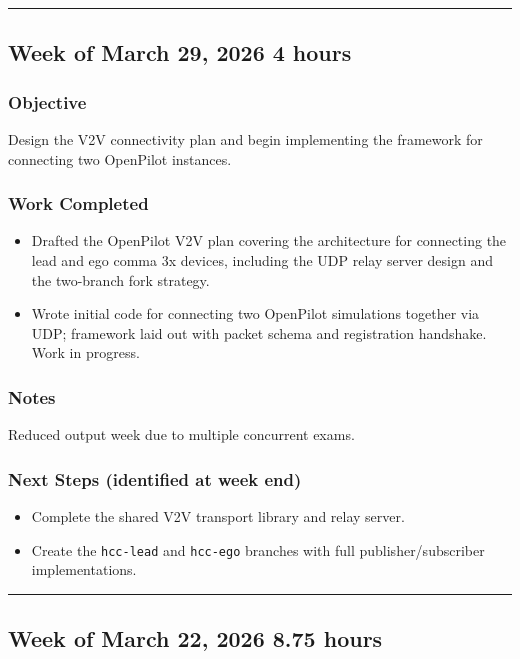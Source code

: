 \documentclass[12pt]{article}
\begin{document}
\hrule\vspace{0.5em}

\subsection{Week of March 29, 2026 \hfill \normalfont\small 4 hours}

\subsubsection{Objective}
Design the V2V connectivity plan and begin implementing the framework for connecting two OpenPilot instances.

\subsubsection{Work Completed}
\begin{itemize}
  \item Drafted the OpenPilot V2V plan covering the architecture for connecting the lead and ego comma 3x devices, including the UDP relay server design and the two-branch fork strategy.
  \item Wrote initial code for connecting two OpenPilot simulations together via UDP; framework laid out with packet schema and registration handshake. Work in progress.
\end{itemize}

\subsubsection{Notes}
Reduced output week due to multiple concurrent exams.

\subsubsection{Next Steps (identified at week end)}
\begin{itemize}
  \item Complete the shared V2V transport library and relay server.
  \item Create the \texttt{hcc-lead} and \texttt{hcc-ego} branches with full publisher/subscriber implementations.
\end{itemize}

\hrule\vspace{0.5em}

\subsection{Week of March 22, 2026 \hfill \normalfont\small 8.75 hours}
\end{document}
